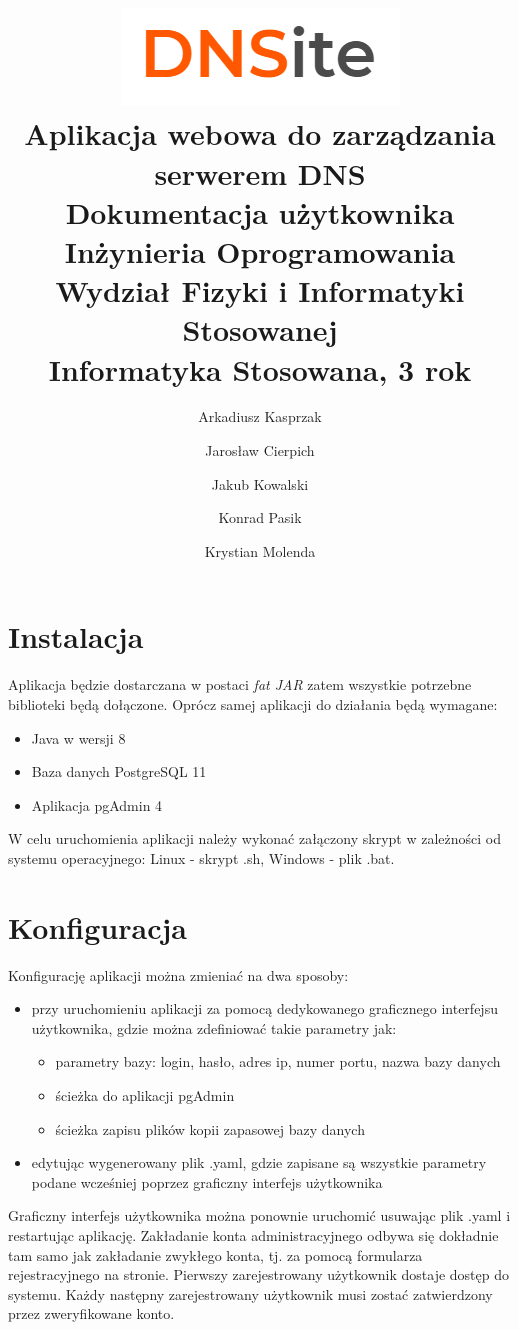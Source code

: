 \documentclass[12pt] {article}
\title 
{	
	\includegraphics[scale = 1]{res/Logo} \\
	{
		\normalfont\sffamily
		Aplikacja webowa do zarządzania serwerem DNS \\[0.1in]
		Dokumentacja użytkownika\\ [0.1in]
		\large 
		Inżynieria Oprogramowania \\
		Wydział Fizyki i Informatyki Stosowanej \\
		Informatyka Stosowana, 3 rok \\
	}
}
\author 
{\normalfont\sffamily Arkadiusz Kasprzak \and \normalfont\sffamily Jarosław Cierpich \and \normalfont\sffamily Jakub Kowalski \and \normalfont\sffamily Konrad Pasik \and \normalfont\sffamily Krystian Molenda}
\date{}
\begin{document}
\maketitle
\newpage

\tableofcontents

\newpage 

\section{Instalacja}
Aplikacja będzie dostarczana w postaci \textit{fat JAR} zatem wszystkie potrzebne biblioteki będą dołączone. Oprócz samej aplikacji do działania będą wymagane:
\begin{itemize}
\item Java w wersji 8
\item Baza danych PostgreSQL 11
\item Aplikacja pgAdmin 4
\end{itemize}
W celu uruchomienia aplikacji należy wykonać załączony skrypt w zależności od systemu operacyjnego: Linux - skrypt .sh, Windows - plik .bat. 

\section{Konfiguracja}
Konfigurację aplikacji można zmieniać na dwa sposoby:
\begin{itemize}
\item przy uruchomieniu aplikacji za pomocą dedykowanego graficznego interfejsu użytkownika, gdzie można zdefiniować takie parametry jak:
\begin{itemize}
\item parametry bazy: login, hasło, adres ip, numer portu, nazwa bazy danych
\item ścieżka do aplikacji pgAdmin
\item ścieżka zapisu plików kopii zapasowej bazy danych
\end{itemize}
\item edytując wygenerowany plik .yaml, gdzie zapisane są wszystkie parametry podane wcześniej poprzez graficzny interfejs użytkownika
\end{itemize}
Graficzny interfejs użytkownika można ponownie uruchomić usuwając plik .yaml i restartując aplikację.\newline
Zakładanie konta administracyjnego odbywa się dokładnie tam samo jak zakładanie zwykłego konta, tj. za pomocą formularza rejestracyjnego na stronie. Pierwszy zarejestrowany użytkownik dostaje dostęp do systemu. Każdy następny zarejestrowany użytkownik musi zostać zatwierdzony przez zweryfikowane konto.
\end{document}
